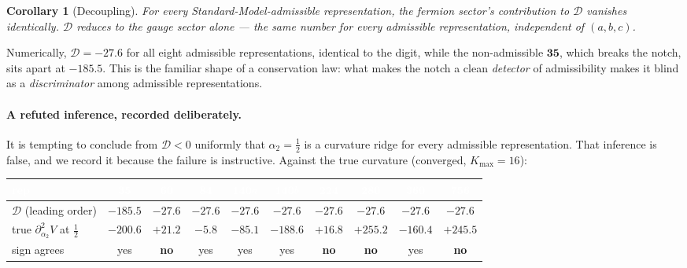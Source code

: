 \documentclass[11pt,a4paper]{article}
\newtheorem{corollary}{Corollary}
\begin{document}
\begin{corollary}[Decoupling]\label{cor:decoupling}
For every Standard-Model-admissible representation, the fermion sector's contribution to
$\mathcal D$ vanishes identically. $\mathcal D$ reduces to the gauge sector alone --- the
same number for every admissible representation, independent of $(a,b,c)$.
\end{corollary}

Numerically, $\mathcal D=-27.6$ for all eight admissible representations, identical to the
digit, while the non-admissible $\mathbf{35}$, which breaks the notch, sits apart at
$-185.5$. This is the familiar shape of a conservation law: what makes the notch a clean
\emph{detector} of admissibility makes it blind as a \emph{discriminator} among admissible
representations.

\paragraph{A refuted inference, recorded deliberately.} It is tempting to conclude from
$\mathcal D<0$ uniformly that $\alpha_2=\tfrac12$ is a curvature ridge for every admissible
representation. That inference is false, and we record it because the failure is instructive.
Against the true curvature (converged, $K_{\max}=16$):

\begin{center}\footnotesize
\begin{tabular}{lccccccccc}
\toprule
\rowcolor{hdrblue}
\textcolor{white}{rep} & \textcolor{white}{$\mathbf{35}$} & \textcolor{white}{$\mathbf{60}$} &
\textcolor{white}{$\mathbf{84}$} & \textcolor{white}{$\mathbf{140}a$} & \textcolor{white}{$\mathbf{140}b$} &
\textcolor{white}{$\mathbf{224}$} & \textcolor{white}{$\mathbf{280}$} & \textcolor{white}{$\mathbf{360}$} &
\textcolor{white}{$\mathbf{756}$}\\
\midrule
$\mathcal D$ (leading order) & $-185.5$ & $-27.6$ & $-27.6$ & $-27.6$ & $-27.6$ & $-27.6$ & $-27.6$ & $-27.6$ & $-27.6$\\
\rowcolor{softgrey}
true $\partial^2_{\alpha_2}V$ at $\tfrac12$ & $-200.6$ & $+21.2$ & $-5.8$ & $-85.1$ & $-188.6$ & $+16.8$ & $+255.2$ & $-160.4$ & $+245.5$\\
sign agrees & yes & \textbf{no} & yes & yes & yes & \textbf{no} & \textbf{no} & yes & \textbf{no}\\
\bottomrule
\end{tabular}
\end{center}
\end{document}
